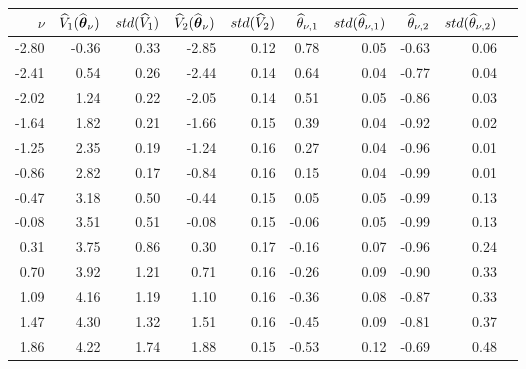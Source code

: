 \begin{tabular}{rrrrrrrrrr}\hline 
$\nu$  & $\widehat{V}_1(\widehat{\boldsymbol{\theta}}_{\nu})$ & $std(\widehat{V}_1)$ & $\widehat{V}_2(\widehat{\boldsymbol{\theta}}_{\nu})$ & $std(\widehat{V}_2)$ & $\widehat{\theta}_{\nu,1}$ & $std(\widehat{\theta}_{\nu,1})$ & $\widehat{\theta}_{\nu,2}$ & $std(\widehat{\theta}_{\nu,2})$ \\ \hline 
-2.80 &    -0.36 &     0.33  &    -2.85 &      0.12 &      0.78 &      0.05 &     -0.63 &      0.06 \\ 
-2.41 &     0.54 &     0.26  &    -2.44 &      0.14 &      0.64 &      0.04 &     -0.77 &      0.04 \\ 
-2.02 &     1.24 &     0.22  &    -2.05 &      0.14 &      0.51 &      0.05 &     -0.86 &      0.03 \\ 
-1.64 &     1.82 &     0.21  &    -1.66 &      0.15 &      0.39 &      0.04 &     -0.92 &      0.02 \\ 
-1.25 &     2.35 &     0.19  &    -1.24 &      0.16 &      0.27 &      0.04 &     -0.96 &      0.01 \\ 
-0.86 &     2.82 &     0.17  &    -0.84 &      0.16 &      0.15 &      0.04 &     -0.99 &      0.01 \\ 
-0.47 &     3.18 &     0.50  &    -0.44 &      0.15 &      0.05 &      0.05 &     -0.99 &      0.13 \\ 
-0.08 &     3.51 &     0.51  &    -0.08 &      0.15 &     -0.06 &      0.05 &     -0.99 &      0.13 \\ 
 0.31 &     3.75 &     0.86  &     0.30 &      0.17 &     -0.16 &      0.07 &     -0.96 &      0.24 \\ 
 0.70 &     3.92 &     1.21  &     0.71 &      0.16 &     -0.26 &      0.09 &     -0.90 &      0.33 \\ 
 1.09 &     4.16 &     1.19  &     1.10 &      0.16 &     -0.36 &      0.08 &     -0.87 &      0.33 \\ 
 1.47 &     4.30 &     1.32  &     1.51 &      0.16 &     -0.45 &      0.09 &     -0.81 &      0.37 \\ 
 1.86 &     4.22 &     1.74  &     1.88 &      0.15 &     -0.53 &      0.12 &     -0.69 &      0.48 \\ 

\end{tabular}
